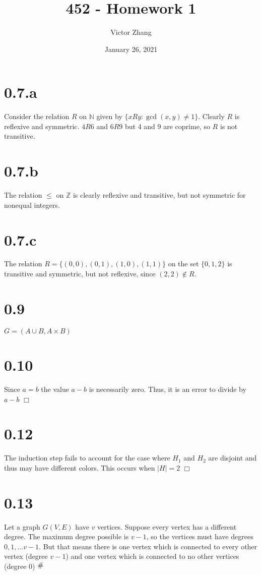 \documentclass{article}
\title{452 - Homework 1}
\author{Victor Zhang}
\date{January 26, 2021}
\newcommand{\contra}{\raisebox{\depth}{\#}}
\begin{document}
\maketitle

\section*{0.7.a}
Consider the relation $R$ on $\mathbb{N}$ given by $\{xRy : \gcd(x,y) \neq 1\}$. Clearly $R$ is reflexive and symmetric. $4R6$ and $6R9$ but 4 and 9 are coprime, so $R$ is not transitive.
\section*{0.7.b}
The relation $\leq$ on $\mathbb{Z}$ is clearly reflexive and transitive, but not symmetric for nonequal integers.
\section*{0.7.c}
The relation $R = \{(0,0),(0,1),(1,0),(1,1)\}$ on the set $\{0,1,2\}$ is transitive and symmetric, but not reflexive, since $(2,2) \notin R$.

\section*{0.9}
$G = (A\cup B, A \times B)$

\section*{0.10}
Since $a = b$ the value $a - b$ is necessarily zero. Thus, it is an error to divide by $a - b$ $\Box$

\section*{0.12}
The induction step fails to account for the case where $H_1$ and $H_2$ are disjoint and thus may have different colors. This occurs when $|H| = 2$ $\Box$

\section*{0.13}
Let a graph $G(V,E)$ have $v$ vertices. Suppose every vertex has a different degree. The maximum degree possible is $v-1$, so the vertices must have degrees $0,1,\dots v-1$. But that means there is one vertex which is connected to every other vertex (degree $v-1$) and one vertex which is connected to no other vertices (degree 0) $\contra$
\end{document}
